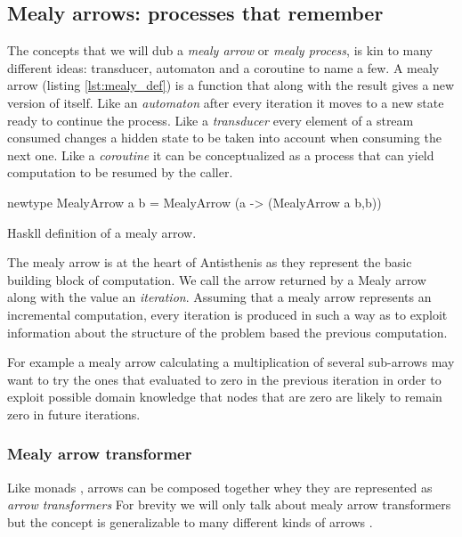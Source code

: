\subsection{Mealy arrows:  processes that remember}
\label{sec:mealy_arrows}

The concepts that we will dub a \emph{mealy arrow} or \emph{mealy process}, is
kin to many different ideas: transducer, automaton and a coroutine to
name a few. A mealy arrow (listing \ref{lst:mealy_def}) is a function that
along with the result gives a new version of itself. Like an
\emph{automaton} after every iteration it moves to a new state ready to
continue the process. Like a \emph{transducer} every element of a stream
consumed changes a hidden state to be taken into account when
consuming the next one. Like a \emph{coroutine} it can be conceptualized as
a process that can yield computation to be resumed by the caller.

\begin{code}
\begin{haskellcode}
newtype MealyArrow a b =
  MealyArrow (a -> (MealyArrow a b,b))
\end{haskellcode}
  \caption{\label{lst:mealy_def}Haskll definition of a mealy arrow.}
\end{code}

The mealy arrow is at the heart of Antisthenis as they represent the
basic building block of computation. We call the arrow returned by a
Mealy arrow along with the value an \emph{iteration}. Assuming that a
mealy arrow represents an incremental computation, every iteration is
produced in such a way as to exploit information about the structure
of the problem based the previous computation.

For example a mealy arrow calculating a multiplication of several
sub-arrows may want to try the ones that evaluated to zero in the
previous iteration in order to exploit possible domain knowledge that
nodes that are zero are likely to remain zero in future iterations.

\subsubsection{Mealy arrow transformer}

Like monads \cite{liangMonadTransformersModular1995} , arrows can be
composed together whey they are represented as \emph{arrow transformers}
For brevity we will only talk about mealy arrow transformers but the
concept is generalizable to many different kinds of arrows
\cite{keidelSoundReusableComponents2019a}.

